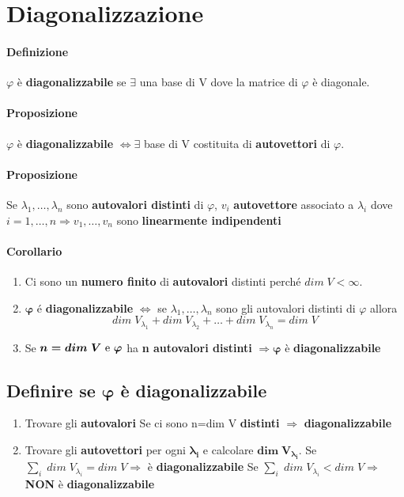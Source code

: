 \documentclass[a4paper, 12pt]{report}
\begin{document}
        \section{Diagonalizzazione}
            \paragraph{Definizione}$\varphi$ è \textbf{diagonalizzabile} se $\exists$ una base di V dove la matrice di $\varphi$ è diagonale.
            \paragraph{Proposizione}$\varphi$ è \textbf{diagonalizzabile} $\Leftrightarrow \exists$ base di V costituita di \textbf{autovettori} di $\varphi$.
            \paragraph{Proposizione}Se $\lambda_1,\dots,\lambda_n$ sono \textbf{autovalori distinti} di $\varphi$, $v_i$
            \textbf{autovettore} associato a $\lambda_i$ dove $i=1,\dots,n \Rightarrow v_1,\dots,v_n$ sono \textbf{linearmente indipendenti}
            \paragraph{Corollario}
            \begin{enumerate}
                \item Ci sono un \textbf{numero finito} di \textbf{autovalori} distinti perché $dim \; V < \infty$.
                \item $\boldsymbol{\varphi}$ é \textbf{diagonalizzabile} $\Leftrightarrow$ se $\lambda_1,\dots,\lambda_n$ sono gli autovalori distinti di $\varphi$ allora
                $$dim \; V_{\lambda_1} + dim \; V_{\lambda_2}+\dots+dim \; V_{\lambda_n}= dim \; V$$
                \item Se $\boldsymbol{n=dim \; V$ e $\varphi}$ ha \textbf{n autovalori distinti} $\Rightarrow \boldsymbol{\varphi}$ è \textbf{diagonalizzabile}
            \end{enumerate}
            \subsection{Definire se $\boldsymbol{\varphi}$ è diagonalizzabile}
            \begin{enumerate}
                \item Trovare gli \textbf{autovalori}
                    \subitem Se ci sono n=dim V \textbf{distinti} $\Rightarrow$ \textbf{diagonalizzabile} 
                \item Trovare gli \textbf{autovettori} per ogni $\boldsymbol{\lambda_i}$ e calcolare $\boldsymbol{dim \; V_{\lambda_i}}$.
                    \subitem Se $\sum_i \; dim \; V_{\lambda_i}= dim \; V \Rightarrow$ è \textbf{diagonalizzabile}
                    \subitem Se $\sum_i \; dim \; V_{\lambda_i}< dim \; V \Rightarrow$ \textbf{NON} è \textbf{diagonalizzabile}
            \end{enumerate}
\end{document}
